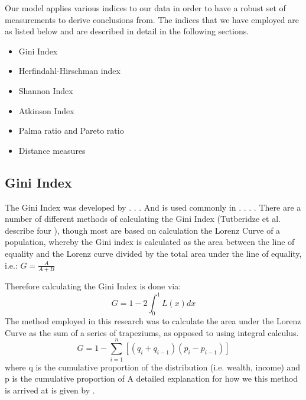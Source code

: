\documentclass[conference]{IEEEtran}
\begin{document}
Our model applies various indices to our data in order to have a robust set of measurements to derive conclusions from.  The indices that we have employed are as listed below and are described in detail in the following sections.

\begin{itemize}
    \item Gini Index
    \item Herfindahl-Hirschman index
    \item Shannon Index
    \item Atkinson Index
    \item Palma ratio and Pareto ratio
    \item Distance measures
\end{itemize}

\subsection{Gini Index}

The Gini Index was developed by  . . .
And is used commonly in . . . .
There are a number of different methods of calculating the Gini Index (Tutberidze et al. describe four \cite{tutberidze2018measuring}), though most are based on calculation the Lorenz Curve of a population, whereby the  Gini index is calculated as the area between the line of equality and the Lorenz curve divided by the total area under the line of equality, i.e.: \(G=\frac{A}{A+B}\)


Therefore calculating the Gini Index is done via:
\[G=1-2\int_{0}^{1}L\left( x \right)dx\]
The method employed in this research was to calculate the area under the Lorenz Curve as the sum of a series of trapeziums, as opposed to using integral calculus.
\[G=1-\sum_{i=1}^{n}\left[ \left( q_{i}+q_{i-1} \right) \left( p_{i}-p_{i-1} \right) \right]\]
where q is the cumulative proportion of the distribution (i.e. wealth, income) and p is the cumulative proportion of 
A detailed explanation for how we this method is arrived at is given by \cite{bellu2006inequality}.
\end{document}
